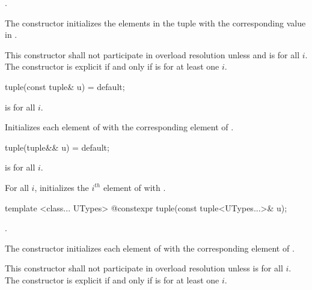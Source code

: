\begin{itemdescr}
\pnum
\requires {} \tcode{==} .

\pnum
\effects The constructor initializes the elements in the tuple with the
corresponding value in .

\pnum
\remarks This constructor shall not participate in overload resolution unless
 and 
is  for all $i$. The constructor is explicit if and only if
 is 
for at least one $i$.
\end{itemdescr}

%
\begin{itemdecl}
tuple(const tuple& u) = default;
\end{itemdecl}

\begin{itemdescr}
\pnum
\requires {} is  for all $i$.

\pnum
\effects Initializes each element of  with the
corresponding element of .
\end{itemdescr}

%
\begin{itemdecl}
tuple(tuple&& u) = default;
\end{itemdecl}

\begin{itemdescr}
\pnum
\requires {} is  for all $i$.

\pnum
\effects For all $i$, initializes the $i^{th}$ element of  with
.
\end{itemdescr}

%
\begin{itemdecl}
template <class... UTypes> @\EXPLICIT@ constexpr tuple(const tuple<UTypes...>& u);
\end{itemdecl}

\begin{itemdescr}
\pnum
\requires
{} \tcode{==} .

\pnum
\effects The constructor initializes each element of 
with the corresponding element of .

\pnum
\remarks This constructor shall not participate in overload resolution unless
 is  for all $i$.
The constructor is explicit if and only if
 is 
for at least one $i$.
\end{itemdescr}

